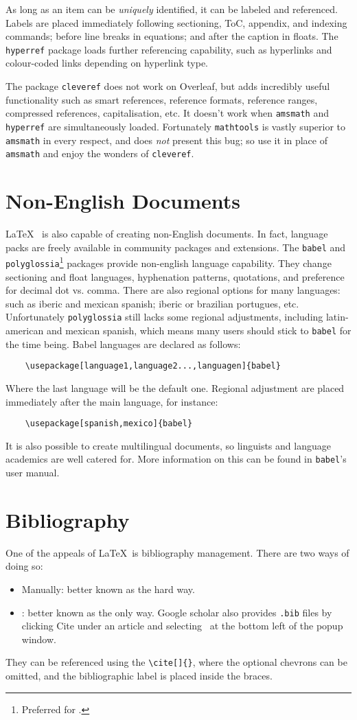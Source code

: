 As long as an item can be \emph{uniquely} identified, it can be
labeled and referenced.  Labels are placed immediately following
sectioning, ToC, appendix, and indexing commands; before line breaks
in equations; and after the caption in floats.  The \verb|hyperref|
package loads further referencing capability, such as hyperlinks and
colour-coded links depending on hyperlink type.

The package \verb|cleveref| does not work on Overleaf, but adds
incredibly useful functionality such as smart references, reference
formats, reference ranges, compressed references, capitalisation, etc.
It doesn't work when \verb|amsmath| and \verb|hyperref| are
simultaneously loaded.  Fortunately \verb|mathtools| is vastly
superior to \verb|amsmath| in every respect, and does \emph{not}
present this bug; so use it in place of \verb|amsmath| and enjoy the
wonders of \verb|cleveref|.
%
\section{Non-English Documents}
%
\LaTeX~ is also capable of creating non-English documents.  In fact,
language packs are freely available in community packages and
extensions.  The \verb|babel| and
\verb|polyglossia|\footnote{Preferred for \XeLaTeX.} packages provide
non-english language capability.  They change sectioning and float
languages, hyphenation patterns, quotations, and preference for
decimal dot vs. comma.  There are also regional options for many
languages: such as iberic and mexican spanish; iberic or brazilian
portugues, etc.  Unfortunately \verb|polyglossia| still lacks some
regional adjustments, including latin-american and mexican spanish,
which means many users should stick to \verb|babel| for the time
being.  Babel languages are declared as follows:
\begin{verbatim}
	\usepackage[language1,language2...,languagen]{babel}
\end{verbatim}
Where the last language will be the default one.  Regional adjustment
are placed immediately after the main language, for instance:
\begin{verbatim}
	\usepackage[spanish,mexico]{babel}
\end{verbatim}

It is also possible to create multilingual documents, so linguists and
language academics are well catered for.  More information on this can
be found in \verb|babel|'s user manual.
%
\section{Bibliography}
%
One of the appeals of \LaTeX~is bibliography management.  There are
two ways of doing so:
\begin{itemize}
\item Manually: better known as the hard way.
\item \BibTeX: better known as the only way.  Google scholar also
  provides \texttt{.bib} files by clicking Cite under an article and
  selecting \BibTeX~at the bottom left of the popup window.
\end{itemize}
They can be referenced using the \verb|\cite[]{}|, where the optional
chevrons can be omitted, and the bibliographic label is placed inside
the braces.
%
